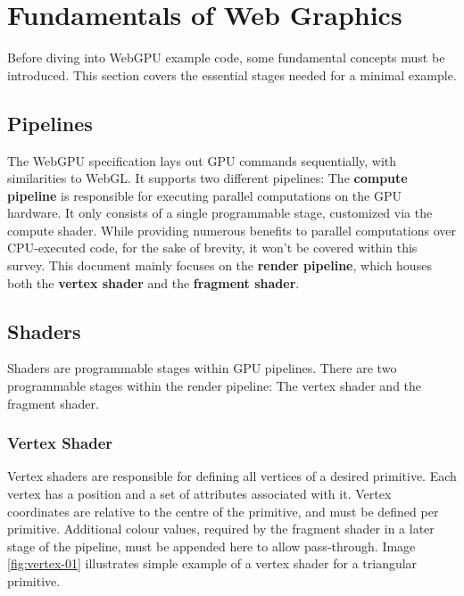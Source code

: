 %
%
% 
% 

\chapter{Fundamentals of Web Graphics}

\label{chap:Fundamentals}

Before diving into WebGPU example code, some fundamental concepts must be introduced.
This section covers the essential stages needed for a minimal example.

\section{Pipelines}
The WebGPU specification lays out GPU commands sequentially, with similarities to WebGL.
It supports two different pipelines:
The \textbf{compute pipeline} is responsible for executing parallel
computations on the GPU hardware. It only consists of a single programmable
stage, customized via the compute shader.
While providing numerous benefits to parallel computations over CPU-executed code, for the sake of brevity, it won't be covered within this survey.
This document mainly focuses on the \textbf{render pipeline}, which houses both the \textbf{vertex shader} and the \textbf{fragment shader}.

\section{Shaders}
Shaders are programmable stages within GPU pipelines.
There are two programmable stages within the render pipeline:
The vertex shader and the fragment shader.

\subsection{Vertex Shader}
Vertex shaders are responsible for defining all vertices of a desired primitive.
Each vertex has a position and a set of attributes associated with it.
Vertex coordinates are relative to the centre of the primitive, and must be defined per primitive.
Additional colour values, required by the fragment shader in a later stage of the pipeline, must be appended here to allow pass-through.
Image \ref{fig:vertex-01} illustrates simple example of a vertex shader for a triangular primitive.


